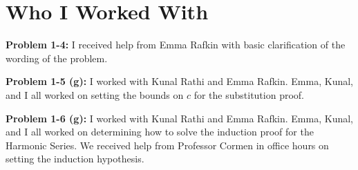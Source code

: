 \documentclass[11pt]{article}
\begin{document}
\newpage

\section{Who I Worked With}

\textbf{Problem 1-4:} I received help from Emma Rafkin with basic clarification of the wording of the problem.

\textbf{Problem 1-5 (g):} I worked with Kunal Rathi and Emma Rafkin. Emma, Kunal, and I all worked on setting the bounds on $c$ for the substitution proof.

\textbf{Problem 1-6 (g):} I worked with Kunal Rathi and Emma Rafkin. Emma, Kunal, and I all worked on determining how to solve the induction proof for the Harmonic Series. We received help from Professor Cormen in office hours on setting the induction hypothesis.
\end{document}
